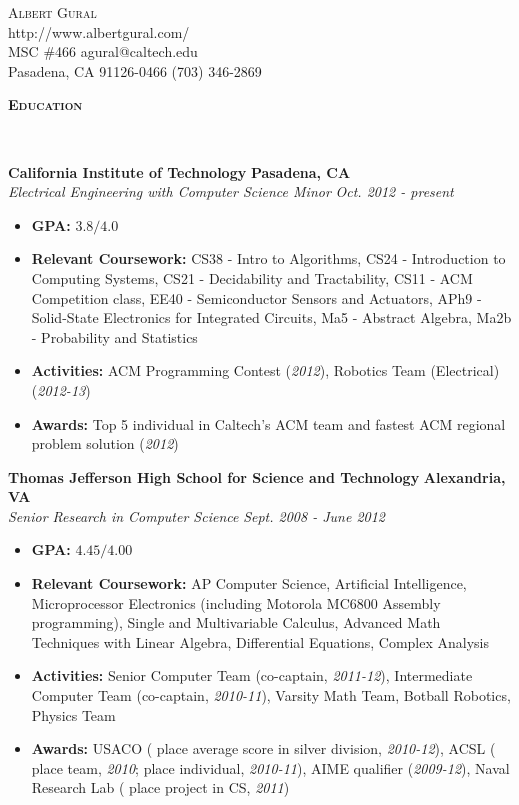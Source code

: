 \documentclass{article}
\newenvironment{changemargin}[2]{%
  \begin{list}{}{%
    \setlength{\topsep}{0pt}%
    \setlength{\leftmargin}{#1}%
    \setlength{\rightmargin}{#2}%
    \setlength{\listparindent}{\parindent}%
    \setlength{\itemindent}{\parindent}%
    \setlength{\parsep}{\parskip}%
  }%
  \item[]}{\end{list}
}
\newcommand{\lineover}{
	\begin{changemargin}{-0.05in}{-0.05in}
		\vspace*{-8pt}
		\hrulefill \\
		\vspace*{-2pt}
	\end{changemargin}
}
\newcommand{\header}[1]{
	\begin{changemargin}{-0.5in}{-0.5in}
		{\large \textbf{\scshape{#1}}}\\
  	\lineover
	\end{changemargin}
}
\newcommand{\contact}[6]{
	\begin{changemargin}{1in}{1in}
		\begin{center}
			{\LARGE \scshape {#1}}\\ \smallskip
			{#4}\\ \smallskip
			{#2} \hfill {#5}\\ \smallskip
			{#3} \hfill {#6}\\ \smallskip 
		\end{center}
	\end{changemargin}
}
\newenvironment{body} {
	\vspace*{-16pt}
	\begin{changemargin}{-0.25in}{-0.5in}
  }	
	{\end{changemargin}
}
\begin{document}
\contact{Albert Gural}{MSC \#466}{Pasadena, CA 91126-0466}{http://www.albertgural.com/}{agural@caltech.edu}{(703) 346-2869}


\header{Education}

\begin{body}
	\vspace{14pt}
	\textbf{California Institute of Technology} \hfill \textbf{Pasadena, CA}{} \\
	\emph{Electrical Engineering with Computer Science Minor} \hfill \emph{Oct. 2012 - present} \\
	\begin{itemize}%
	\item \textbf{GPA:} $3.8 / 4.0$
	\item \textbf{Relevant Coursework:} CS38 - Intro to Algorithms, CS24 - Introduction to Computing Systems, CS21 - Decidability and Tractability, CS11 - ACM Competition class, EE40 - Semiconductor Sensors and Actuators, APh9 - Solid-State Electronics for Integrated Circuits, Ma5 - Abstract Algebra, Ma2b - Probability and Statistics
	\item \textbf{Activities:} ACM Programming Contest (\textit{2012}), Robotics Team (Electrical) (\textit{2012-13})
	\item \textbf{Awards:} Top 5 individual in Caltech's ACM team and fastest ACM regional problem solution (\textit{2012})
	\end{itemize}

	\medskip

	\textbf{Thomas Jefferson High School for Science and Technology} \hfill \textbf{Alexandria, VA} \\
	\emph{Senior Research in Computer Science} \hfill \emph{Sept. 2008 - June 2012} \\
	\begin{itemize}%
	\item \textbf{GPA:} $4.45 / 4.00$
	\item \textbf{Relevant Coursework:} AP Computer Science, Artificial Intelligence, Microprocessor Electronics (including Motorola MC6800 Assembly programming), Single and Multivariable Calculus, Advanced Math Techniques with Linear Algebra, Differential Equations, Complex Analysis
	\item \textbf{Activities:} Senior Computer Team (co-captain, \textit{2011-12}), Intermediate Computer Team (co-captain, \textit{2010-11}), Varsity Math Team, Botball Robotics, Physics Team
	\item \textbf{Awards:} USACO ( place average score in silver division, \textit{2010-12}), ACSL ( place team, \textit{2010};  place individual, \textit{2010-11}), AIME qualifier (\textit{2009-12}), Naval Research Lab ( place project in CS, \textit{2011})
	\end{itemize}
\end{body}
\end{document}
